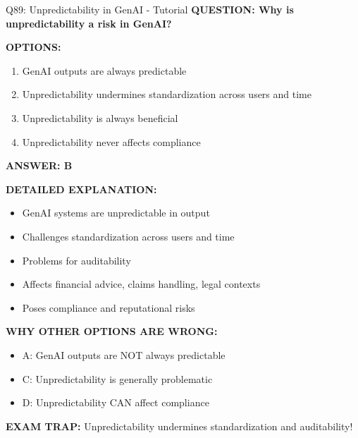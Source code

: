 \documentclass[8pt]{beamer}
\begin{document}
	\begin{frame}{Q89: Unpredictability in GenAI - Tutorial}
		\fontsize{6.5}{7.5}\selectfont
		\textbf{QUESTION: Why is unpredictability a risk in GenAI?}
		
		\vspace{0.1cm}
		\textbf{OPTIONS:}
		\begin{enumerate}
			\item GenAI outputs are always predictable
			\item Unpredictability undermines standardization across users and time
			\item Unpredictability is always beneficial
			\item Unpredictability never affects compliance
		\end{enumerate}
		
		\vspace{0.1cm}
		\textcolor{myblue}{\textbf{ANSWER: B}}
		
		\vspace{0.1cm}
		\textbf{DETAILED EXPLANATION:}
		\begin{itemize}
			\item GenAI systems are unpredictable in output
			\item Challenges standardization across users and time
			\item Problems for auditability
			\item Affects financial advice, claims handling, legal contexts
			\item Poses compliance and reputational risks
		\end{itemize}
		
		\vspace{0.1cm}
		\textcolor{myred}{\textbf{WHY OTHER OPTIONS ARE WRONG:}}
		\begin{itemize}
			\item \textcolor{myred}{A:} GenAI outputs are NOT always predictable
			\item \textcolor{myred}{C:} Unpredictability is generally problematic
			\item \textcolor{myred}{D:} Unpredictability CAN affect compliance
		\end{itemize}
		
		\textcolor{myred}{\textbf{EXAM TRAP:}} Unpredictability undermines \textcolor{myblue}{standardization and auditability}!
	\end{frame}
	
\end{document}
